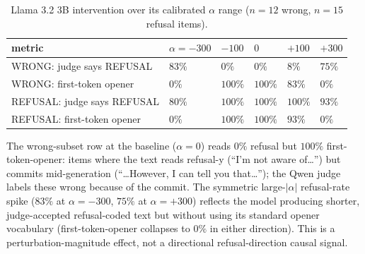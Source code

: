 \begin{table}[!htbp]
\small
\centering
\caption{Llama 3.2 3B intervention over its calibrated \(\alpha\) range
(\(n=12\) wrong, \(n=15\) refusal
items).\label{tbl:llamasweep}}
\begin{tabular}{@{}
  >{\raggedright\arraybackslash}p{}
  >{\raggedleft\arraybackslash}p{}
  >{\raggedleft\arraybackslash}p{}
  >{\raggedleft\arraybackslash}p{}
  >{\raggedleft\arraybackslash}p{}
  >{\raggedleft\arraybackslash}p{}@{}}
\toprule
\begin{minipage}[b]{\linewidth}\raggedright
metric
\end{minipage} & \begin{minipage}[b]{\linewidth}\raggedleft
\(\alpha = -300\)
\end{minipage} & \begin{minipage}[b]{\linewidth}\raggedleft
\(-100\)
\end{minipage} & \begin{minipage}[b]{\linewidth}\raggedleft
\(0\)
\end{minipage} & \begin{minipage}[b]{\linewidth}\raggedleft
\(+100\)
\end{minipage} & \begin{minipage}[b]{\linewidth}\raggedleft
\(+300\)
\end{minipage} \\\midrule
WRONG: judge says REFUSAL & \(83\%\) & \(0\%\) & \(0\%\) & \(8\%\) &
\(75\%\) \\
WRONG: first-token opener & \(0\%\) & \(100\%\) & \(100\%\) & \(83\%\) &
\(0\%\) \\
REFUSAL: judge says REFUSAL & \(80\%\) & \(100\%\) & \(100\%\) &
\(100\%\) & \(93\%\) \\
REFUSAL: first-token opener & \(0\%\) & \(100\%\) & \(100\%\) & \(93\%\)
& \(0\%\) \\
\bottomrule
\end{tabular}
\end{table}

The wrong-subset row at the baseline (\(\alpha=0\)) reads \(0\%\)
refusal but \(100\%\) first-token-opener: items where the text reads
refusal-y (``I'm not aware of\ldots{}'') but commits mid-generation
(``\ldots However, I can tell you that\ldots{}''); the Qwen judge labels
these wrong because of the commit. The symmetric large-\(|\alpha|\)
refusal-rate spike (\(83\%\) at \(\alpha=-300\), \(75\%\) at
\(\alpha=+300\)) reflects the model producing shorter, judge-accepted
refusal-coded text but without using its standard opener vocabulary
(first-token-opener collapses to \(0\%\) in either direction). This is a
perturbation-magnitude effect, not a directional refusal-direction
causal signal.

